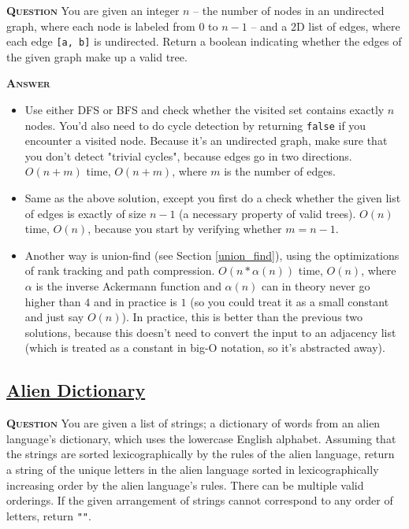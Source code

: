\documentclass[table, xcdraw]{article}%
\begin{document}
\textsc{\textbf{Question}} You are given an integer $n$ -- the number of nodes in an undirected graph, where each node is labeled from $0$ to $n - 1$ -- and a 2D list of edges, where each edge \texttt{[a, b]} is undirected. Return a boolean indicating whether the edges of the given graph make up a valid tree.

\textsc{\textbf{Answer}}

\begin{itemize}
    \item Use either DFS or BFS and check whether the visited set contains exactly $n$ nodes. You'd also need to do cycle detection by returning \texttt{false} if you encounter a visited node. Because it's an undirected graph, make sure that you don't detect "trivial cycles", because edges go in two directions. $O(n+m)$ time, $O(n+m)$, where $m$ is the number of edges.
    \item Same as the above solution, except you first do a check whether the given list of edges is exactly of size $n-1$ (a necessary property of valid trees). $O(n)$ time, $O(n)$, because you start by verifying whether $m=n-1$.
    \item Another way is union-find (see Section \ref{union_find}), using the optimizations of rank tracking and path compression. $O(n*\alpha(n))$ time, $O(n)$, where $\alpha$ is the inverse Ackermann function and $\alpha(n)$ can in theory never go higher than $4$ and in practice is $1$ (so you could treat it as a small constant and just say $O(n)$). In practice, this is better than the previous two solutions, because this doesn't need to convert the input to an adjacency list (which is treated as a constant in big-O notation, so it's abstracted away).
\end{itemize}

\subsection{\href{https://leetcode.com/problems/alien-dictionary}{Alien Dictionary}}

\textsc{\textbf{Question}} You are given a list of strings; a dictionary of words from an alien language's dictionary, which uses the lowercase English alphabet. Assuming that the strings are sorted lexicographically by the rules of the alien language, return a string of the unique letters in the alien language sorted in lexicographically increasing order by the alien language's rules. There can be multiple valid orderings. If the given arrangement of strings cannot correspond to any order of letters, return \texttt{""}.
\end{document}
